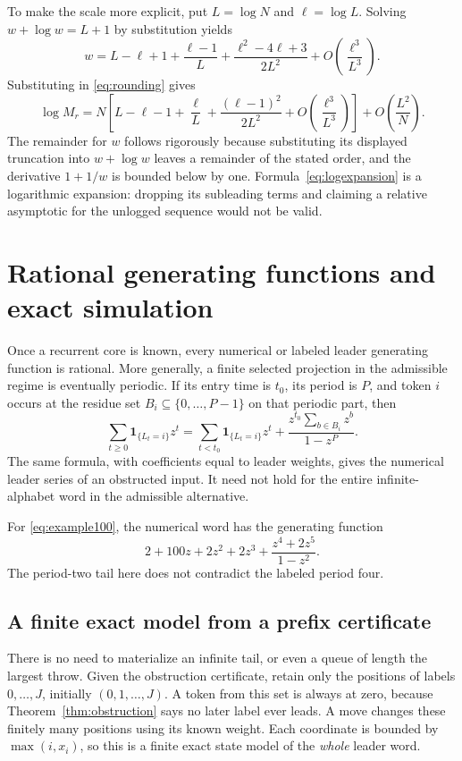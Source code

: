 \documentclass[11pt,letterpaper]{article}
\theoremstyle{definition}
\newcommand{\ind}{\mathbf 1}
\begin{document}
To make the scale more explicit, put $L=\log N$ and $\ell=\log L$.
Solving $w+\log w=L+1$ by substitution yields
\[
 w=L-\ell+1+\frac{\ell-1}{L}
       +\frac{\ell^2-4\ell+3}{2L^2}
       +O\left(\frac{\ell^3}{L^3}\right).
\]
Substituting in \eqref{eq:rounding} gives
\begin{equation}\label{eq:logexpansion}
 \log M_r=N\left[L-\ell-1+\frac\ell L
                 +\frac{(\ell-1)^2}{2L^2}
                 +O\left(\frac{\ell^3}{L^3}\right)\right]
            +O\left(\frac{L^2}{N}\right).
\end{equation}
The remainder for $w$ follows rigorously because substituting its displayed
truncation into $w+\log w$ leaves a remainder of the stated order, and the
derivative $1+1/w$ is bounded below by one. Formula~\eqref{eq:logexpansion}
is a logarithmic expansion: dropping its subleading terms and claiming a
relative asymptotic for the unlogged sequence would not be valid.

\section{Rational generating functions and exact simulation}\label{sec:implementation}
Once a recurrent core is known, every numerical or labeled leader generating
function is rational. More generally, a finite selected projection in the
admissible regime is eventually periodic. If its entry time is $t_0$, its
period is $P$, and token $i$ occurs at the residue set
$B_i\subseteq\{0,\ldots,P-1\}$ on that periodic part, then
\begin{equation}\label{eq:leadergf}
 \sum_{t\ge0}\ind_{\{L_t=i\}}z^t
   =\sum_{t<t_0}\ind_{\{L_t=i\}}z^t
     +\frac{z^{t_0}\sum_{b\in B_i}z^b}{1-z^P}.
\end{equation}
The same formula, with coefficients equal to leader weights, gives the
numerical leader series of an obstructed input. It need not hold for the
entire infinite-alphabet word in the admissible alternative.

For \eqref{eq:example100}, the numerical word has the generating function
\begin{equation}\label{eq:examplegf}
 2+100z+2z^2+2z^3+\frac{z^4+2z^5}{1-z^2}.
\end{equation}
The period-two tail here does not contradict the labeled period four.

\subsection{A finite exact model from a prefix certificate}
There is no need to materialize an infinite tail, or even a queue of length
the largest throw. Given the obstruction certificate, retain only the
positions of labels $0,\ldots,J$, initially $(0,1,\ldots,J)$. A token from
this set is always at zero, because Theorem~\ref{thm:obstruction} says no
later label ever leads. A move changes these finitely many positions using
its known weight. Each coordinate is bounded by $\max(i,x_i)$, so this is a
finite exact state model of the \emph{whole} leader word.
\end{document}
